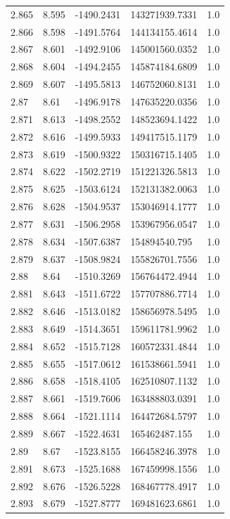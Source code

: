 \begin{tabular}{lllll}
2.865 & 8.595 & -1490.2431 & 143271939.7331 & 1.0 \\
2.866 & 8.598 & -1491.5764 & 144134155.4614 & 1.0 \\
2.867 & 8.601 & -1492.9106 & 145001560.0352 & 1.0 \\
2.868 & 8.604 & -1494.2455 & 145874184.6809 & 1.0 \\
2.869 & 8.607 & -1495.5813 & 146752060.8131 & 1.0 \\
2.87 & 8.61 & -1496.9178 & 147635220.0356 & 1.0 \\
2.871 & 8.613 & -1498.2552 & 148523694.1422 & 1.0 \\
2.872 & 8.616 & -1499.5933 & 149417515.1179 & 1.0 \\
2.873 & 8.619 & -1500.9322 & 150316715.1405 & 1.0 \\
2.874 & 8.622 & -1502.2719 & 151221326.5813 & 1.0 \\
2.875 & 8.625 & -1503.6124 & 152131382.0063 & 1.0 \\
2.876 & 8.628 & -1504.9537 & 153046914.1777 & 1.0 \\
2.877 & 8.631 & -1506.2958 & 153967956.0547 & 1.0 \\
2.878 & 8.634 & -1507.6387 & 154894540.795 & 1.0 \\
2.879 & 8.637 & -1508.9824 & 155826701.7556 & 1.0 \\
2.88 & 8.64 & -1510.3269 & 156764472.4944 & 1.0 \\
2.881 & 8.643 & -1511.6722 & 157707886.7714 & 1.0 \\
2.882 & 8.646 & -1513.0182 & 158656978.5495 & 1.0 \\
2.883 & 8.649 & -1514.3651 & 159611781.9962 & 1.0 \\
2.884 & 8.652 & -1515.7128 & 160572331.4844 & 1.0 \\
2.885 & 8.655 & -1517.0612 & 161538661.5941 & 1.0 \\
2.886 & 8.658 & -1518.4105 & 162510807.1132 & 1.0 \\
2.887 & 8.661 & -1519.7606 & 163488803.0391 & 1.0 \\
2.888 & 8.664 & -1521.1114 & 164472684.5797 & 1.0 \\
2.889 & 8.667 & -1522.4631 & 165462487.155 & 1.0 \\
2.89 & 8.67 & -1523.8155 & 166458246.3978 & 1.0 \\
2.891 & 8.673 & -1525.1688 & 167459998.1556 & 1.0 \\
2.892 & 8.676 & -1526.5228 & 168467778.4917 & 1.0 \\
2.893 & 8.679 & -1527.8777 & 169481623.6861 & 1.0 \\

\end{tabular}
